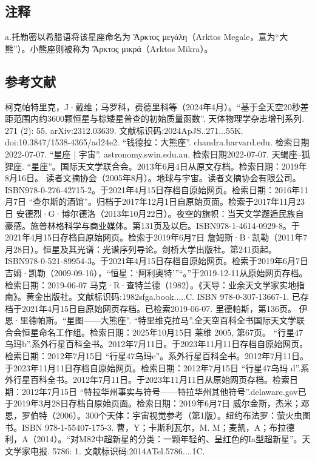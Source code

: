 \subsection{注释}

a.托勒密以希腊语将该星座命名为 Ἄρκτος μεγάλη（Arktos Megale，意为“大熊”）。小熊座则被称为 Ἄρκτος μικρά（Arktos Mikra）。\\
\subsection{参考文献}
 柯克帕特里克，J·戴维；马罗科，费德里科等（2024年4月）。“基于全天空20秒差距范围内约3600颗恒星与棕矮星普查的初始质量函数”. 天体物理学杂志增刊系列. 271 (2): 55. arXiv:2312.03639. 文献标识码:2024ApJS..271...55K. doi:10.3847/1538-4365/ad24e2.
 “钱德拉：大熊座”. chandra.harvard.edu. 检索日期2022-07-07.
 “星座 | 宇宙”. astronomy.swin.edu.au. 检索日期2022-07-07.
 天蝎座–狐狸座.
 “星座”。国际天文学联合会。2013年6月4日从原文存档。检索日期：2019年8月16日。
 读者文摘协会（2005年8月）。地球与宇宙。读者文摘协会有限公司。ISBN978-0-276-42715-2。于2021年4月15日存档自原始网页。检索日期：2016年11月7日
 “查尔斯的酒馆”。归档于2017年12月1日自原始页面。检索于2017年11月23日
 安德烈·G·博尔德洛（2013年10月22日）。夜空的旗帜：当天文学邂逅民族自豪感。施普林格科学与商业媒体。第131页及以后。ISBN978-1-4614-0929-8。于2021年4月15日存档自原始网页。检索于2019年6月7日
 詹姆斯·B·凯勒（2011年7月28日）。恒星及其光谱：光谱序列导论。剑桥大学出版社。第241页起。ISBN978-0-521-89954-3。于2021年4月15日存档自原始网页。检索于2019年6月7日
 吉姆·凯勒（2009-09-16），“恒星：‘阿利奥特’”“。”于2019-12-11从原始网页存档。检索日期：2019-06-07
 马克·R·查特兰德（1982）。《天导：业余天文学家实地指南》。黄金出版社。文献标识码:1982sfga.book.....C. ISBN 978-0-307-13667-1. 已存档于2021年4月15日自原始网页存档。已检索2019-06-07.
 里德帕斯，第136页。
 伊恩·里德帕斯。“星图——大熊座”.
 “特里维克拉马”.全天空百科全书国际天文学联合会恒星命名工作组。检索日期：2025年10月15日
 莱维 2005, 第67页。
 “行星47乌玛b”.系外行星百科全书。2012年7月11日。于2023年11月11日存档自原始网页。检索日期：2012年7月15日
 “行星47乌玛c”。系外行星百科全书。2012年7月11日。于2023年11月11日存档自原始网页。检索日期：2012年7月15日
 “行星47乌玛 d”.系外行星百科全书。2012年7月11日。于2023年11月11日从原始网页存档。检索日期：2012年7月15日
 “特拉华州事实与符号——特拉华州其他符号”.delaware.gov已于2019年3月28日存档自原始页面。检索日期：2019年6月7日
 威尔金斯，杰米；邓恩，罗伯特（2006）。300个天体：宇宙视觉参考（第1版）。纽约布法罗：萤火虫图书。ISBN 978-1-55407-175-3.
 曹，Y；卡斯利瓦尔，M. M；麦凯，A；布拉德利，A（2014）。“对M82中超新星的分类：一颗年轻的、呈红色的Ia型超新星”。天文学家电报. 5786: 1. 文献标识码:2014ATel.5786....1C.
